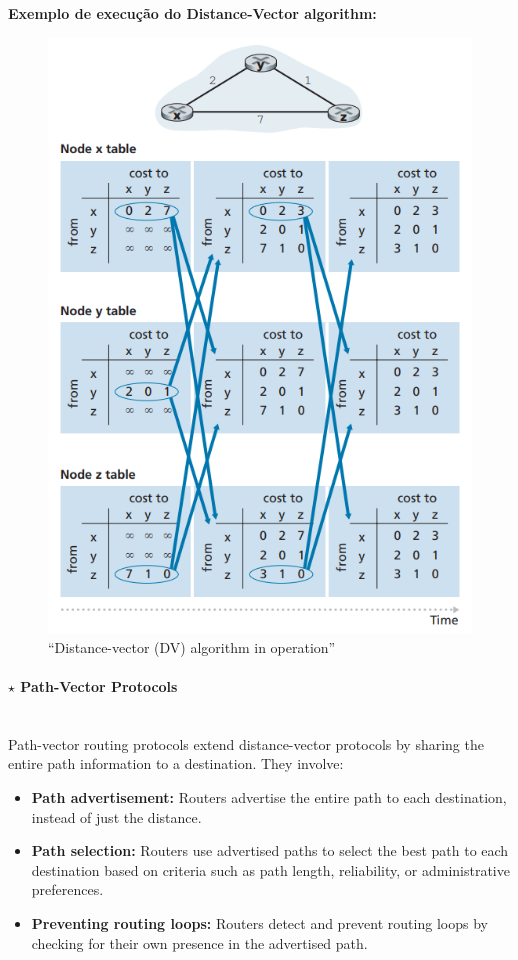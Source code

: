 \noindent \textbf{Exemplo de execução do Distance-Vector algorithm:}
\begin{figure}[H]
    \centering
    \includegraphics[width = 0.75\linewidth]{img/4/control-plane/distance-vector/DV-example.png}
    \caption{``Distance-vector (DV) algorithm in operation''\cite{Kurose2017}}
    \label{fig:shortest-path-DV}
\end{figure}

\clearpage
\paragraph[4.3.1.3 Path-Vector Protocols]{$\pmb{\star}$ Path-Vector Protocols}\mbox{}\\[4pt]
Path-vector routing protocols extend distance-vector protocols by sharing the entire path information to a destination. They involve:

\begin{itemize}
    \item \textbf{Path advertisement:} Routers advertise the entire path to each destination, instead of just the distance.
    
    \item \textbf{Path selection:} Routers use advertised paths to select the best path to each destination based on criteria such as path length, reliability, or administrative preferences.
    
    \item \textbf{Preventing routing loops:} Routers detect and prevent routing loops by checking for their own presence in the advertised path.
\end{itemize}

